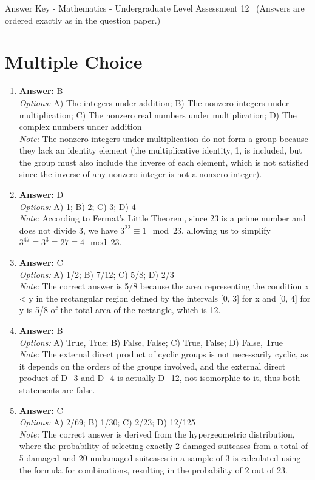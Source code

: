 \documentclass[12pt]{article}
\begin{document}
\begin{center}
Answer Key - Mathematics - Undergraduate Level Assessment 12 \
\small (Answers are ordered exactly as in the question paper.)
\end{center}

\section*{Multiple Choice}
\begin{enumerate}[label=\arabic*.]
\item \textbf{Answer:} B
\\ \textit{Options:} A) The integers under addition; B) The nonzero integers under multiplication; C) The nonzero real numbers under multiplication; D) The complex numbers under addition
\\ \textit{Note:} The nonzero integers under multiplication do not form a group because they lack an identity element (the multiplicative identity, 1, is included, but the group must also include the inverse of each element, which is not satisfied since the inverse of any nonzero integer is not a nonzero integer).
\item \textbf{Answer:} D
\\ \textit{Options:} A) 1; B) 2; C) 3; D) 4
\\ \textit{Note:} According to Fermat's Little Theorem, since 23 is a prime number and does not divide 3, we have \(3^{22} \equiv 1 \mod 23\), allowing us to simplify \(3^{47} \equiv 3^{3} \equiv 27 \equiv 4 \mod 23\).
\item \textbf{Answer:} C
\\ \textit{Options:} A) 1/2; B) 7/12; C) 5/8; D) 2/3
\\ \textit{Note:} The correct answer is 5/8 because the area representing the condition x \textless{} y in the rectangular region defined by the intervals [0, 3] for x and [0, 4] for y is 5/8 of the total area of the rectangle, which is 12.
\item \textbf{Answer:} B
\\ \textit{Options:} A) True, True; B) False, False; C) True, False; D) False, True
\\ \textit{Note:} The external direct product of cyclic groups is not necessarily cyclic, as it depends on the orders of the groups involved, and the external direct product of D\_3 and D\_4 is actually D\_12, not isomorphic to it, thus both statements are false.
\item \textbf{Answer:} C
\\ \textit{Options:} A) 2/69; B) 1/30; C) 2/23; D) 12/125
\\ \textit{Note:} The correct answer is derived from the hypergeometric distribution, where the probability of selecting exactly 2 damaged suitcases from a total of 5 damaged and 20 undamaged suitcases in a sample of 3 is calculated using the formula for combinations, resulting in the probability of 2 out of 23.
\end{enumerate}
\end{document}
